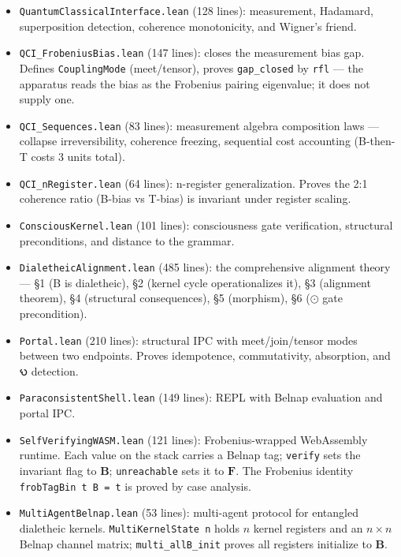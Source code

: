 \documentclass[10pt,a4paper]{article}
\newcommand{\pilcrow}{\S}
\begin{document}
\begin{itemize}
    \item \texttt{QuantumClassicalInterface.\allowbreak lean} (128 lines): measurement, Hadamard, superposition detection, coherence monotonicity, and Wigner's friend.
    \item \texttt{QCI\_\allowbreak FrobeniusBias.\allowbreak lean} (147 lines): closes the measurement bias gap. Defines \texttt{CouplingMode} (meet/tensor), proves \texttt{gap\_\allowbreak closed} by \texttt{rfl} --- the apparatus reads the bias as the Frobenius pairing eigenvalue; it does not supply one.
    \item \texttt{QCI\_\allowbreak Sequences.\allowbreak lean} (83 lines): measurement algebra composition laws --- collapse irreversibility, coherence freezing, sequential cost accounting (B-then-T costs 3 units total).
    \item \texttt{QCI\_\allowbreak nRegister.\allowbreak lean} (64 lines): n-register generalization. Proves the 2:1 coherence ratio (B-bias vs T-bias) is invariant under register scaling.
    \item \texttt{ConsciousKernel.\allowbreak lean} (101 lines): consciousness gate verification, structural preconditions, and distance to the grammar.
    \item \texttt{DialetheicAlignment.\allowbreak lean} (485 lines): the comprehensive alignment theory --- \pilcrow{}1 (B is dialetheic), \pilcrow{}2 (kernel cycle operationalizes it), \pilcrow{}3 (alignment theorem), \pilcrow{}4 (structural consequences), \pilcrow{}5 (morphism), \pilcrow{}6 ($\odot$ gate precondition).
    \item \texttt{Portal.\allowbreak lean} (210 lines): structural IPC with meet/join/tensor modes between two endpoints. Proves idempotence, commutativity, absorption, and 𐑻 detection.
    \item \texttt{ParaconsistentShell.\allowbreak lean} (149 lines): REPL with Belnap evaluation and portal IPC.
    \item \texttt{SelfVerifyingWASM.\allowbreak lean} (121 lines): Frobenius-wrapped WebAssembly runtime. Each value on the stack carries a Belnap tag; \texttt{verify} sets the invariant flag to $\mathbf{B}$; \texttt{unreachable} sets it to $\mathbf{F}$. The Frobenius identity \texttt{frobTagBin t B = t} is proved by case analysis.
    \item \texttt{MultiAgentBelnap.\allowbreak lean} (53 lines): multi-agent protocol for entangled dialetheic kernels. \texttt{MultiKernelState n} holds $n$ kernel registers and an $n \times n$ Belnap channel matrix; \texttt{multi\_\allowbreak allB\_\allowbreak init} proves all registers initialize to $\mathbf{B}$.

\end{itemize}
\end{document}
